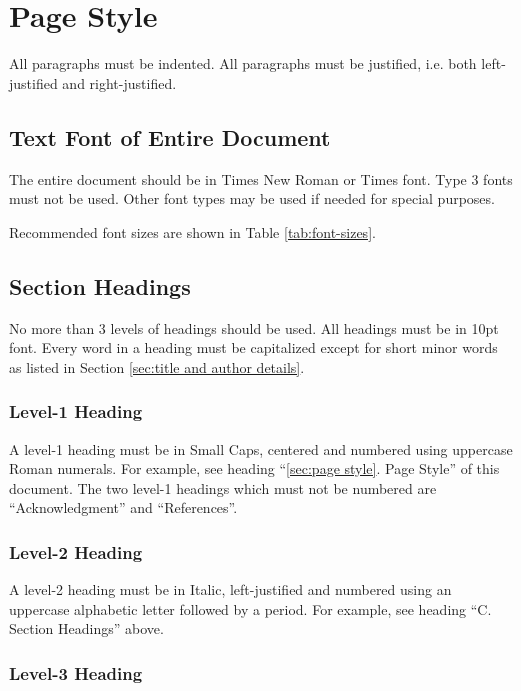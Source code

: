 \documentclass[10pt,conference,letterpaper]{IEEEtran}
\begin{document}
\section{Page Style}
\label{sec:page style}

All paragraphs must be indented.  All paragraphs must be
justified, i.e. both left-justified and right-justified. 

\subsection{Text Font of Entire Document}

The entire document should be in Times New Roman or Times font.
Type 3 fonts must not be used.  Other font types may be used if
needed for special purposes.  

Recommended font sizes are shown in Table \ref{tab:font-sizes}.

\subsection{Section Headings}

No more than 3 levels of headings should be used.  All headings must
be in 10pt font.  Every word in a heading must be capitalized except
for short minor words as listed in Section \ref{sec:title and author
details}.

\subsubsection{Level-1 Heading}

A level-1 heading must be in Small Caps, centered and numbered using
uppercase Roman numerals.  For example, see heading ``\ref{sec:page
style}. Page Style'' of this document.  The two level-1 headings which
must not be numbered are ``Acknowledgment'' and ``References''.

\subsubsection{Level-2 Heading}

A level-2 heading must be in Italic, left-justified and numbered using
an uppercase alphabetic letter followed by a period.  For example, see
heading ``C. Section Headings'' above.

\subsubsection{Level-3 Heading}
\end{document}
